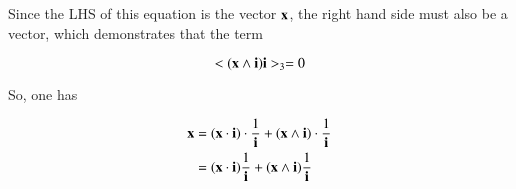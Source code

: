 \documentclass{article}
\begin{document}
Since the LHS of this equation is the vector $\mathbf{x}$, the right hand side must
also be a vector, which demonstrates that the term

\[
<(\mathbf{x} \wedge \mathbf{i}) \mathbf{i}>_3 = 0
\]

So, one has

\begin{align*}
\mathbf{x} 
&=
{(\mathbf{x} \cdot \mathbf{i}) \cdot \frac{1}{\mathbf{i}}} + {(\mathbf{x} \wedge \mathbf{i}) \cdot \frac{1}{\mathbf{i}}} \\
&=
{(\mathbf{x} \cdot \mathbf{i}) \frac{1}{\mathbf{i}}} + {(\mathbf{x} \wedge \mathbf{i}) \frac{1}{\mathbf{i}}} \\
\end{align*}
\end{document}
